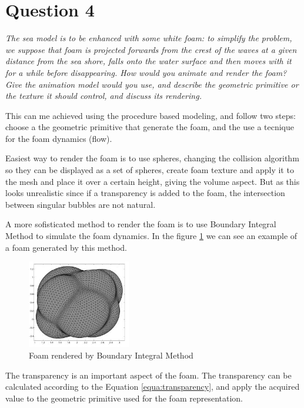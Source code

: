 \documentclass{report}
\begin{document}
\section{Question 4}

\emph{The sea model is to be enhanced with some white foam: to simplify the problem, we
suppose that foam is projected forwards from the crest of the waves at a given distance from
the sea shore, falls onto the water surface and then moves with it for a while before
disappearing. How would you animate and render the foam? Give the animation model would
you use, and describe the geometric primitive or the texture it should control, and discuss its
rendering.}

This can me achieved using the procedure based modeling, and follow two steps: choose a the geometric primitive that generate the foam, and the use a tecnique for the foam dynamics (flow). 

Easiest way to render the foam is to use spheres, changing the collision algorithm so they can be displayed as a set of spheres, create foam texture and apply it to the mesh and place it over a certain height, giving the volume aspect.
But as this looks unrealistic since if a transparency is added to the foam, the intersection between singular bubbles are not natural. 

A more sofisticated method to render the foam is to use Boundary Integral Method to simulate the foam dynamics\cite{bim}. In the figure \ref{fig:dim-foam} we can see an example of a foam generated by this method.

\begin{figure}[H]
\centering
\includegraphics[width=0.4\textwidth]{image/dim01.png}
\caption{Foam rendered by Boundary Integral Method}
\label{fig:dim-foam}
\end{figure}

The transparency is an important aspect of the foam. The transparency can be calculated\cite{nvidia} according to the Equation \ref{equa:transparency}, and apply the acquired value to the geometric primitive used for the foam representation.
\end{document}
